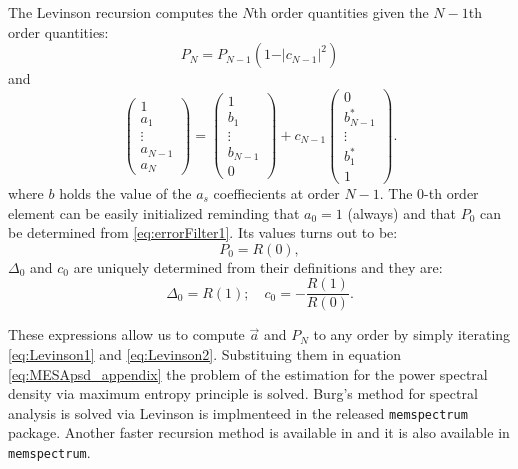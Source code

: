 \documentclass[twocolumn,showpacs,preprintnumbers,nofootinbib,prd,
superscriptaddress,10pt]{revtex4-1}
\begin{document}
The Levinson recursion computes the $N$th order quantities given the $N-1$th order quantities: 
\begin{equation} \label{eq:Levinson1}
P_N = P_{N -1}\left(1 - \vert c_{N - 1} \vert ^2\right)
\end{equation}
and 
\begin{equation} \label{eq:Levinson2}
\begin{pmatrix}
1 \\ a_1 \\ \vdots \\ a_{N - 1} \\ a_N
\end{pmatrix}
= 
\begin{pmatrix}
1 \\ b_1 \\ \vdots \\ b_{N -1} \\ 0
\end{pmatrix}
+ c_{N-1}
\begin{pmatrix}
0 \\ b_{N -1}^* \\ \vdots \\ b^*_1 \\ 1
\end{pmatrix}. 
\end{equation}
where $b$ holds the value of the $a_s$ coeffiecients at order $N-1$. 
The 0-th order element can be easily initialized reminding that $a_0 = 1$ (always) and that $P_0$ can be determined from \eqref{eq:errorFilter1}.
Its values turns out to be: 
\begin{equation}
P_0 = R(0),
\end{equation}
$\Delta_0$ and $c_0$ are uniquely determined from their definitions and they are:
\begin{equation}
\Delta_0 = R(1); \quad c_0 = -\frac{R(1)}{R(0)}. 
\end{equation}

These expressions allow us to compute $\vec a$ and $P_N$ to any order by simply iterating \eqref{eq:Levinson1} and \eqref{eq:Levinson2}. Substituing them in equation \eqref{eq:MESApsd_appendix} the problem of the estimation for the power spectral density via maximum entropy principle is solved.
Burg's method for spectral analysis is solved via Levinson is implmenteed in the released \texttt{memspectrum} package.
Another faster recursion method is available in \cite{Vos} and it is also available in \texttt{memspectrum}.

\newpage

	
	
\end{document}
